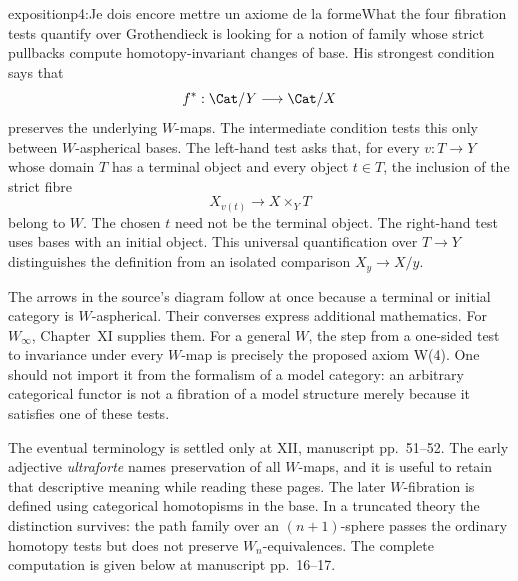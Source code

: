 \begin{dcomment}{exposition}{p4:Je dois encore mettre un axiome de la forme}{What the four fibration tests quantify over}
Grothendieck is looking for a notion of family whose strict pullbacks compute homotopy-invariant changes of base. His strongest condition says that
\[
  f^*:\Cat/Y\longrightarrow\Cat/X
\]
preserves the underlying \(W\)-maps. The intermediate condition tests this only between \(W\)-aspherical bases. The left-hand test asks that, for every \(v:T\to Y\) whose domain \(T\) has a terminal object and every object \(t\in T\), the inclusion of the strict fibre
\[
   X_{v(t)}\longrightarrow X\times_Y T
\]
belong to \(W\). The chosen \(t\) need not be the terminal object. The right-hand test uses bases with an initial object. This universal quantification over \(T\to Y\) distinguishes the definition from an isolated comparison \(X_y\to X/y\).

The arrows in the source's diagram follow at once because a terminal or initial category is \(W\)-aspherical. Their converses express additional mathematics. For \(W_\infty\), Chapter~XI supplies them. For a general \(W\), the step from a one-sided test to invariance under every \(W\)-map is precisely the proposed axiom W(4). One should not import it from the formalism of a model category: an arbitrary categorical functor is not a fibration of a model structure merely because it satisfies one of these tests.

The eventual terminology is settled only at XII, manuscript pp.~51--52. The early adjective \emph{ultraforte} names preservation of all \(W\)-maps, and it is useful to retain that descriptive meaning while reading these pages. The later \(W\)-fibration is defined using categorical homotopisms in the base. In a truncated theory the distinction survives: the path family over an \((n+1)\)-sphere passes the ordinary homotopy tests but does not preserve \(W_n\)-equivalences. The complete computation is given below at manuscript pp.~16--17.
\end{dcomment}

